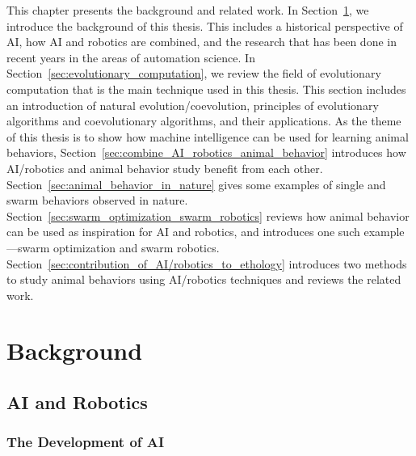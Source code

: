 This chapter presents the background and related work. In Section~\ref{sec:background}, we introduce the background of this thesis. This includes a historical perspective of AI, how AI and robotics are combined, and the research that has been done in recent years in the areas of automation science. In Section~\ref{sec:evolutionary_computation}, we review the field of evolutionary computation that is the main technique used in this thesis. This section includes an introduction of natural evolution/coevolution, principles of evolutionary algorithms and coevolutionary algorithms, and their applications. As the theme of this thesis is to show how machine intelligence can be used for learning animal behaviors, Section~\ref{sec:combine_AI_robotics_animal_behavior} introduces how AI/robotics and animal behavior study benefit from each other. Section~\ref{sec:animal_behavior_in_nature} gives some examples of single and swarm behaviors observed in nature. Section~\ref{sec:swarm_optimization_swarm_robotics} reviews how animal behavior can be used as inspiration for AI and robotics, and introduces one such example---swarm optimization and swarm robotics. Section~\ref{sec:contribution_of_AI/robotics_to_ethology} introduces two methods to study animal behaviors using AI/robotics techniques and reviews the related work.  

\section{Background}\label{sec:background}

\subsection{AI and Robotics}\label{sec:AI_and_robotics}

\subsubsection{The Development of AI}\label{sec:development_of_AI}

